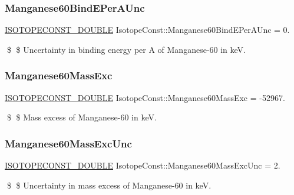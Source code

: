 \subsubsection{\texorpdfstring{Manganese60\+Bind\+E\+Per\+A\+Unc}{Manganese60BindEPerAUnc}}
{\footnotesize\ttfamily \mbox{\hyperlink{group___isotope_const-_macros_ga8f45a7272ce02c0b4c65c44636ed719a}{I\+S\+O\+T\+O\+P\+E\+C\+O\+N\+S\+T\+\_\+\+D\+O\+U\+B\+LE}} Isotope\+Const\+::\+Manganese60\+Bind\+E\+Per\+A\+Unc = 0.}

\$ \$ Uncertainty in binding energy per A of Manganese-\/60 in keV. \mbox{\label{group___isotope_const-_manganese-_mn60_ga9cadc4994fdfef2527fea4cc6ff0e001}} 
\subsubsection{\texorpdfstring{Manganese60\+Mass\+Exc}{Manganese60MassExc}}
{\footnotesize\ttfamily \mbox{\hyperlink{group___isotope_const-_macros_ga8f45a7272ce02c0b4c65c44636ed719a}{I\+S\+O\+T\+O\+P\+E\+C\+O\+N\+S\+T\+\_\+\+D\+O\+U\+B\+LE}} Isotope\+Const\+::\+Manganese60\+Mass\+Exc = -\/52967.}

\$ \$ Mass excess of Manganese-\/60 in keV. \mbox{\label{group___isotope_const-_manganese-_mn60_ga8ed2019cf125e4ad0b57b98d91280e40}} 
\subsubsection{\texorpdfstring{Manganese60\+Mass\+Exc\+Unc}{Manganese60MassExcUnc}}
{\footnotesize\ttfamily \mbox{\hyperlink{group___isotope_const-_macros_ga8f45a7272ce02c0b4c65c44636ed719a}{I\+S\+O\+T\+O\+P\+E\+C\+O\+N\+S\+T\+\_\+\+D\+O\+U\+B\+LE}} Isotope\+Const\+::\+Manganese60\+Mass\+Exc\+Unc = 2.}

\$ \$ Uncertainty in mass excess of Manganese-\/60 in keV. \mbox{\label{group___isotope_const-_manganese-_mn60_ga813a2125ea4eec2924d61da303456233}} 
